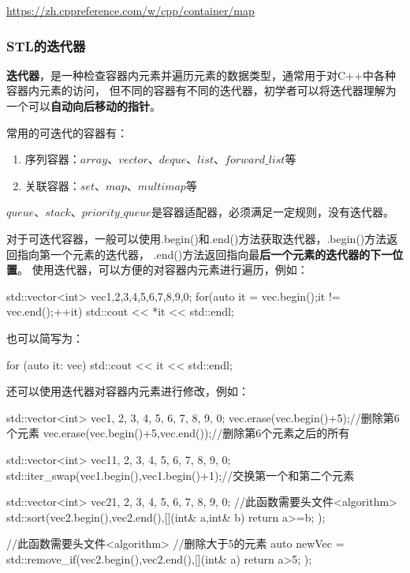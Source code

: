 \url{https://zh.cppreference.com/w/cpp/container/map}

\subsubsection{STL的迭代器}

\textbf{迭代器}，是一种检查容器内元素并遍历元素的数据类型，通常用于对C++中各种容器内元素的访问，
但不同的容器有不同的迭代器，初学者可以将迭代器理解为一个可以\textbf{自动向后移动的指针}。

常用的可迭代的容器有：

\begin{enumerate}
    \item 序列容器：$array$、$vector$、$deque$、$list$、$forward\_list$等
    \item 关联容器：$set$、$map$、$multimap$等
\end{enumerate}

$queue$、$stack$、$priority\_queue$是容器适配器，必须满足一定规则，没有迭代器。

对于可迭代容器，一般可以使用.begin()和.end()方法获取迭代器，.begin()方法返回指向第一个元素的迭代器，
.end()方法返回指向最\textbf{后一个元素的迭代器的下一位置}。
使用迭代器，可以方便的对容器内元素进行遍历，例如：

\begin{tcode}
std::vector<int> vec{1,2,3,4,5,6,7,8,9,0};
for(auto it = vec.begin();it != vec.end();++it){
    std::cout << *it << std::endl;
}
\end{tcode}

也可以简写为：

\begin{tcode}
for (auto it: vec) {
    std::cout << it << std::endl;
}
\end{tcode}

还可以使用迭代器对容器内元素进行修改，例如：

\begin{tcode}
std::vector<int> vec{1, 2, 3, 4, 5, 6, 7, 8, 9, 0};
vec.erase(vec.begin()+5);//删除第6个元素
vec.erase(vec.begin()+5,vec.end());//删除第6个元素之后的所有

std::vector<int> vec1{1, 2, 3, 4, 5, 6, 7, 8, 9, 0};
std::iter_swap(vec1.begin(),vec1.begin()+1);//交换第一个和第二个元素

std::vector<int> vec2{1, 2, 3, 4, 5, 6, 7, 8, 9, 0};
//此函数需要头文件<algorithm>
std::sort(vec2.begin(),vec2.end(),[](int& a,int& b){
    return a>=b;
});

//此函数需要头文件<algorithm>
//删除大于5的元素
auto newVec = std::remove_if(vec2.begin(),vec2.end(),[](int& a){
    return a>5;
});
\end{tcode}

